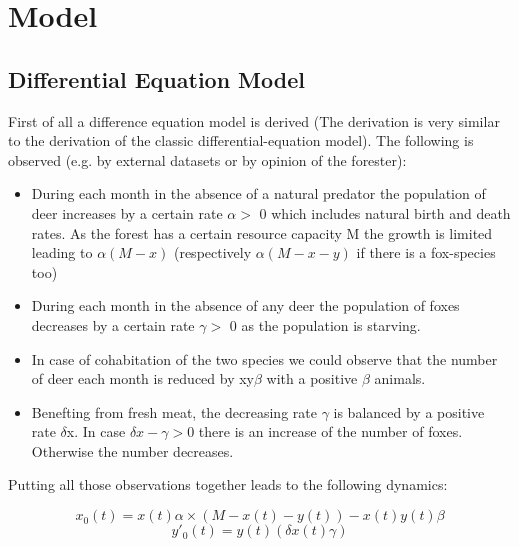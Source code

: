 \documentclass[a4paper,12pt]{article}
\begin{document}
\section{Model}
\subsection{Differential Equation Model} 
First of all a difference equation model is derived (The derivation is very similar to the derivation of the
classic differential-equation model). The following is observed (e.g. by external datasets or by opinion of the forester):

\begin{itemize}
\item{During each month in the absence of a natural predator the population of deer increases by a
certain rate $\alpha >$ 0 which includes natural birth and death rates. As the forest has a certain
resource capacity M the growth is limited leading to $\alpha(M-x)$ (respectively $\alpha(M-x-y)$ if there
is a fox-species too)}
\item{During each month in the absence of any deer the population of foxes decreases by a certain rate
 $\gamma >$ 0 as the population is starving.}
\item{In case of cohabitation of the two species we could observe that the number of deer each month is
reduced by xy$\beta$ with a positive $\beta$ animals.}
\item{Benefting from fresh meat, the decreasing rate $\gamma$
 is balanced by a positive rate $\delta$x. In case $\delta x-\gamma
 > 0$
there is an increase of the number of foxes. Otherwise the number decreases.}\\
\end{itemize}
Putting all those observations together leads to the following dynamics:

\begin{center}
\begin{equation}
x_0(t) = x(t)\alpha \times(M - x(t) - y(t)) - x(t)y(t)\beta 
\label{eq:1}
\end{equation}
\begin{equation}
y'_0(t) = y(t)(\delta x(t) \gamma)
\label{eq:2}
\end{equation}
\end{center}
\end{document}
